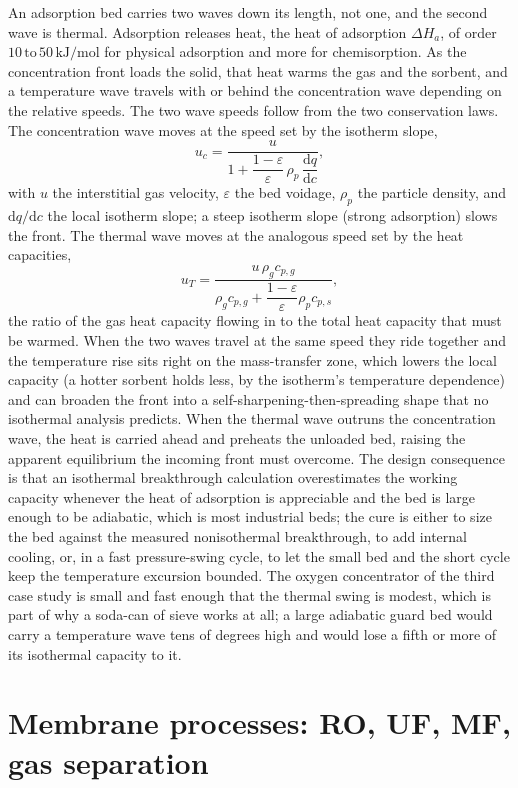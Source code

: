 \begin{mastery}
An adsorption bed carries two waves down its length, not one, and the
second wave is thermal. Adsorption releases heat, the heat of adsorption
$\Delta H_a$, of order $10\,\text{to}\,50\,\text{kJ/mol}$ for physical
adsorption and more for chemisorption. As the concentration front loads
the solid, that heat warms the gas and the sorbent, and a temperature wave
travels with or behind the concentration wave depending on the relative
speeds. The two wave speeds follow from the two conservation laws. The
concentration wave moves at the speed set by the isotherm slope,
\[
u_c = \frac{u}{1 + \dfrac{1-\varepsilon}{\varepsilon}\,\rho_p\,
\dfrac{\mathrm{d}q}{\mathrm{d}c}},
\]
with $u$ the interstitial gas velocity, $\varepsilon$ the bed voidage,
$\rho_p$ the particle density, and $\mathrm{d}q/\mathrm{d}c$ the local
isotherm slope; a steep isotherm slope (strong adsorption) slows the
front. The thermal wave moves at the analogous speed set by the heat
capacities,
\[
u_T = \frac{u\,\rho_g c_{p,g}}{\rho_g c_{p,g} + \dfrac{1-\varepsilon}
{\varepsilon}\rho_p c_{p,s}},
\]
the ratio of the gas heat capacity flowing in to the total heat capacity
that must be warmed. When the two waves travel at the same speed they ride
together and the temperature rise sits right on the mass-transfer zone,
which lowers the local capacity (a hotter sorbent holds less, by the
isotherm's temperature dependence) and can broaden the front into a
self-sharpening-then-spreading shape that no isothermal analysis predicts.
When the thermal wave outruns the concentration wave, the heat is carried
ahead and preheats the unloaded bed, raising the apparent equilibrium the
incoming front must overcome. The design consequence is that an isothermal
breakthrough calculation overestimates the working capacity whenever the
heat of adsorption is appreciable and the bed is large enough to be
adiabatic, which is most industrial beds; the cure is either to size the
bed against the measured nonisothermal breakthrough, to add internal
cooling, or, in a fast pressure-swing cycle, to let the small bed and the
short cycle keep the temperature excursion bounded. The oxygen
concentrator of the third case study is small and fast enough that the
thermal swing is modest, which is part of why a soda-can of sieve works at
all; a large adiabatic guard bed would carry a temperature wave tens of
degrees high and would lose a fifth or more of its isothermal capacity to
it.
\end{mastery}

\section{Membrane processes: RO, UF, MF, gas separation}


